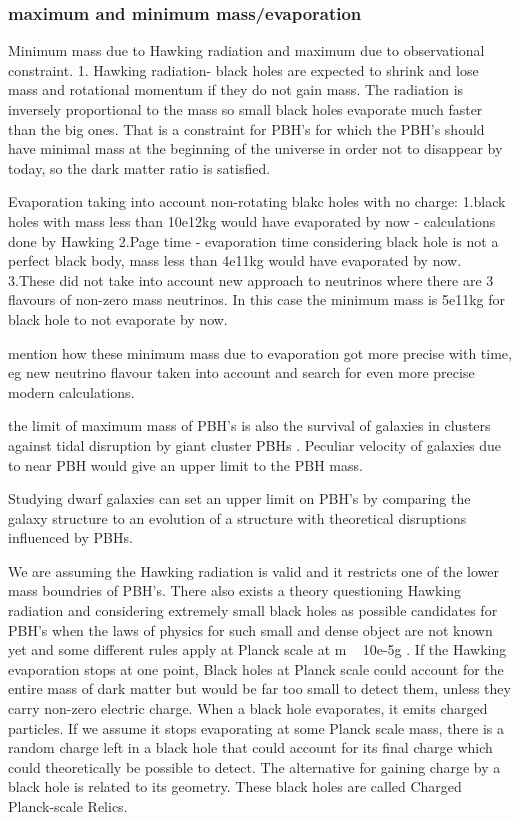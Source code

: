 ﻿\documentclass{article}
\begin{document}
\subsubsection {maximum and minimum mass/evaporation}
Minimum mass due to Hawking radiation and maximum due to observational constraint.
1. Hawking radiation- black holes are expected to shrink and lose mass and rotational momentum if they do not gain mass. The radiation is inversely proportional to the mass so small black holes evaporate much faster than the big ones. That is a constraint for PBH's for which the PBH's should have minimal mass at the beginning of the universe in order not to disappear by today, so the dark matter ratio is satisfied. 

Evaporation taking into account non-rotating blakc holes with no charge:
1.black holes with mass less than 10e12kg would have evaporated by now - calculations done by Hawking 
2.Page time - evaporation time considering black hole is not a perfect black body, mass less than 4e11kg would have evaporated by now. 
3.These did not take into account new approach to neutrinos where there are 3 flavours of non-zero mass neutrinos. In this case the minimum mass is 5e11kg for black hole to not evaporate by now. 

mention how these minimum mass due to evaporation got more precise with time, eg new neutrino flavour taken into account and search for even more precise modern calculations.

the limit of maximum mass of PBH's is also the survival of galaxies in clusters against tidal disruption by giant cluster PBHs \cite{PBH_as_DM_candidate}. Peculiar velocity of galaxies due to near PBH would give an upper limit to the PBH mass. 

Studying dwarf galaxies can set an upper limit on PBH's by comparing the galaxy structure to an evolution of a structure with theoretical disruptions influenced by PBHs. 


We are assuming the Hawking radiation is valid and it restricts one of the lower mass boundries of PBH's. There also exists a theory questioning Hawking radiation and considering extremely small black holes as possible candidates for PBH's when the laws of physics for such small and dense object are not known yet and some different rules apply at Planck scale at m ~ 10e-5g . If the Hawking evaporation stops at one point, Black holes at Planck scale could account for the entire mass of dark matter but would be far too small to detect them, unless they carry non-zero electric charge. When a black hole evaporates, it emits charged particles. If we assume it stops evaporating at some Planck scale mass, there is a random charge left in a black hole that could account for its final charge which could theoretically be possible to detect. The alternative for gaining charge by a black hole is related to its geometry. These black holes are called Charged Planck-scale Relics.  \cite{Lehmann_2019} 
\end{document}
